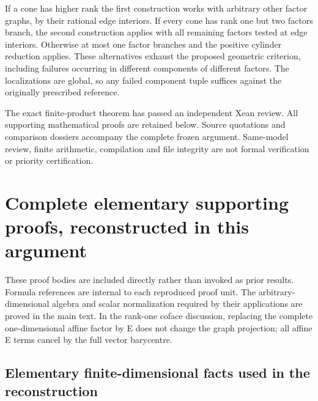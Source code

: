 \documentclass[
  11pt,
]{article}
\begin{document}
If a cone has higher rank the first construction works with arbitrary
other factor graphs, by their rational edge interiors. If every cone has
rank one but two factors branch, the second construction applies with
all remaining factors tested at edge interiors. Otherwise at most one
factor branches and the positive cylinder reduction applies. These
alternatives exhaust the proposed geometric criterion, including
failures occurring in different components of different factors. The
localizations are global, so any failed component tuple suffices against
the originally prescribed reference.

The exact finite-product theorem has passed an independent Xean
review. All supporting mathematical proofs are retained below. Source
quotations and comparison dossiers accompany the complete frozen
argument. Same-model review, finite arithmetic, compilation and file
integrity are not formal verification or priority certification.

\section{Complete elementary supporting proofs, reconstructed in this
argument}\label{complete-elementary-supporting-proofs-reconstructed-in-this-argument}

These proof bodies are included directly rather than invoked as prior
results. Formula references are internal to each reproduced proof unit.
The arbitrary-dimensional algebra and scalar normalization required by
their applications are proved in the main text. In the rank-one coface
discussion, replacing the complete one-dimensional affine factor by E
does not change the graph projection; all affine E terms cancel by the
full vector barycentre.

\subsection{Elementary finite-dimensional facts used in the
reconstruction}\label{elementary-finite-dimensional-facts-used-in-the-reconstruction}
\end{document}
